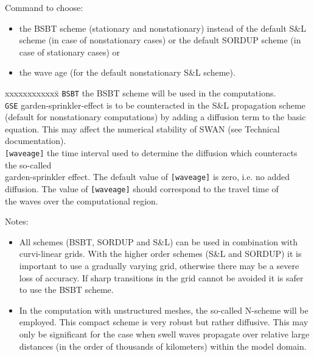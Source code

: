 \documentclass[12pt]{book}
\begin{document}
\noindent
Command to choose:
\begin{itemize}
  \item the BSBT scheme (stationary and nonstationary) instead of the default S\&L scheme (in case
        of nonstationary cases) or the default SORDUP scheme (in case of stationary cases) or
  \item the wave age (for the default nonstationary S\&L scheme).
\end{itemize}
\begin{tabbing}
xxxxxxxxxxxx\= \kill
{\tt BSBT}      \> the BSBT scheme will be used in the computations.\\
{\tt GSE}       \> garden-sprinkler-effect is to be counteracted in the S\&L propagation scheme\+\\
                   (default for nonstationary computations) by adding a diffusion term to the basic\\
                   equation. This may affect the numerical stability of SWAN (see Technical\\
                   documentation).\-\\
{\tt [waveage]} \> the time interval used to determine the diffusion which counteracts the so-called\+\\
                   garden-sprinkler effect. The default value of {\tt [waveage]} is zero, i.e. no added\\
                   diffusion. The value of {\tt [waveage]} should correspond to the travel time of\\
                   the waves over the computational region.\-\\
\end{tabbing}
Notes:
\begin{itemize}
  \item All schemes (BSBT, SORDUP and S\&L) can be used in combination with curvi-linear grids. With the
        higher order schemes (S\&L and SORDUP) it is important to use a gradually varying grid, otherwise there
        may be a severe loss of accuracy. If sharp transitions in the grid cannot be avoided it is safer to use
        the BSBT scheme.
  \item In the computation with unstructured meshes, the so-called N-scheme will be employed. This compact
        scheme is very robust but rather diffusive. This may only be significant for the case when swell
        waves propagate over relative large distances (in the order of thousands of kilometers) within the
        model domain.
\end{itemize}
\end{document}

